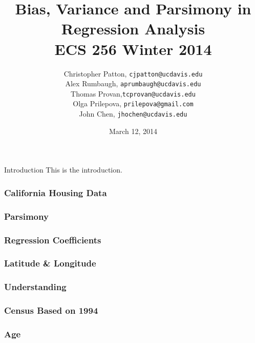 \documentclass{beamer}
\title[Bias, Variance and Parsimony in Regression Analysis]{Bias, Variance and Parsimony in Regression Analysis\\ECS 256 Winter 2014}
\author[Matloff]{
Christopher Patton, \texttt{cjpatton@ucdavis.edu}\\
Alex Rumbaugh, \texttt{aprumbaugh@ucdavis.edu}\\
Thomas Provan,\texttt{tcprovan@ucdavis.edu}\\
Olga Prilepova, \texttt{prilepova@gmail.com}\\
John Chen, \texttt{jhochen@ucdavis.edu}}
\institute{ECS 256, Winter 2014\\ \Large{UC Davis}}
\date{March 12, 2014}
\begin{document}
\begin{frame}
\titlepage
\end{frame}


\begin{frame}{Introduction}
This is the introduction.
\end{frame}


\begin{frame}
    \frametitle{California Housing Data}
\end{frame}

\begin{frame}
    \frametitle{Parsimony}
\end{frame}

\begin{frame}
    \frametitle{Regression Coefficients}
\end{frame}

\begin{frame}
    \frametitle{Latitude \& Longitude}
\end{frame}

\begin{frame}
    \frametitle{Understanding}
\end{frame}

\begin{frame}
\end{frame}

\begin{frame}
\end{frame}

\begin{frame}
\end{frame}




\begin{frame}
\frametitle{Census Based on 1994}
\end{frame}

\begin{frame}
\frametitle{Age}
\end{frame}
\end{document}

